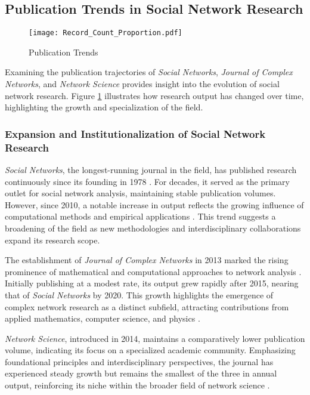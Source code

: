 \documentclass[twocolumn]{article}
\begin{document}
	\subsection{Publication Trends in Social Network Research}
	
	\begin{figure}[htbp]
		\centering
		\caption{Publication Trends}\label{fig.fig1}
		\texttt{[image: Record\_Count\_Proportion.pdf]}
	\end{figure}
	
	Examining the publication trajectories of \textit{Social Networks}, \textit{Journal of Complex Networks}, and \textit{Network Science} provides insight into the evolution of social network research. Figure \ref{fig.fig1} illustrates how research output has changed over time, highlighting the growth and specialization of the field.
	
	\subsubsection*{Expansion and Institutionalization of Social Network Research}
	
	\textit{Social Networks}, the longest-running journal in the field, has published research continuously since its founding in 1978 \cite{Freeman2004}. For decades, it served as the primary outlet for social network analysis, maintaining stable publication volumes. However, since 2010, a notable increase in output reflects the growing influence of computational methods and empirical applications \cite{Borgatti2009}. This trend suggests a broadening of the field as new methodologies and interdisciplinary collaborations expand its research scope.
	
	The establishment of \textit{Journal of Complex Networks} in 2013 marked the rising prominence of mathematical and computational approaches to network analysis \cite{Barabasi2016}. Initially publishing at a modest rate, its output grew rapidly after 2015, nearing that of \textit{Social Networks} by 2020. This growth highlights the emergence of complex network research as a distinct subfield, attracting contributions from applied mathematics, computer science, and physics \cite{Borgatti2009}.
	
	\textit{Network Science}, introduced in 2014, maintains a comparatively lower publication volume, indicating its focus on a specialized academic community. Emphasizing foundational principles and interdisciplinary perspectives, the journal has experienced steady growth but remains the smallest of the three in annual output, reinforcing its niche within the broader field of network science \cite{Barabasi2016}.
	
\end{document}
